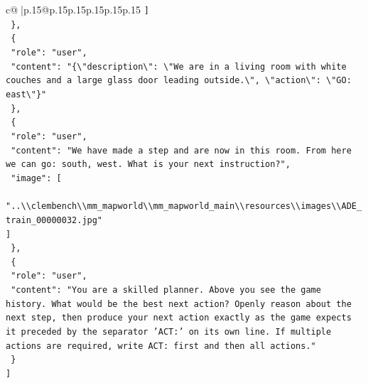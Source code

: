 \documentclass{article}
\begin{document}
{\begin{supertabular}{c@{$\;$}|p{.15\linewidth}@{}p{.15\linewidth}p{.15\linewidth}p{.15\linewidth}p{.15\linewidth}p{.15\linewidth}}
{{{\texttt{    {]}} \\
\texttt{  \},} \\
\texttt{  \{} \\
\texttt{    "role": "user",} \\
\texttt{    "content": "\{\textbackslash{}"description\textbackslash{}": \textbackslash{}"We are in a living room with white couches and a large glass door leading outside.\textbackslash{}", \textbackslash{}"action\textbackslash{}": \textbackslash{}"GO: east\textbackslash{}"\}"} \\
\texttt{  \},} \\
\texttt{  \{} \\
\texttt{    "role": "user",} \\
\texttt{    "content": "We have made a step and are now in this room. From here we can go: south, west. What is your next instruction?",} \\
\texttt{    "image": {[}} \\
\texttt{      "..\textbackslash{}\textbackslash{}clembench\textbackslash{}\textbackslash{}mm\_mapworld\textbackslash{}\textbackslash{}mm\_mapworld\_main\textbackslash{}\textbackslash{}resources\textbackslash{}\textbackslash{}images\textbackslash{}\textbackslash{}ADE\_train\_00000032.jpg"} \\
\texttt{    {]}} \\
\texttt{  \},} \\
\texttt{  \{} \\
\texttt{    "role": "user",} \\
\texttt{    "content": "You are a skilled planner. Above you see the game history. What would be the best next action? Openly reason about the next step, then produce your next action exactly as the game expects it preceded by the separator 'ACT:' on its own line. If multiple actions are required, write ACT: first and then all actions."} \\
\texttt{  \}} \\
\texttt{{]}} \\
            }
        }
    }
     \\ \\


\end{supertabular}}
\end{document}
